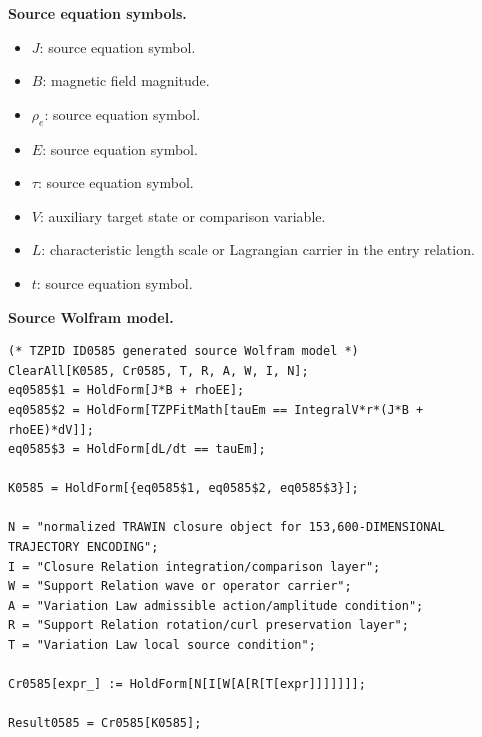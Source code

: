 \begin{minipage}[t]{0.49\linewidth}
\begingroup
\small
\raggedright
\textbf{Source equation symbols.}\par
\begin{itemize}[leftmargin=1.35em,itemsep=1pt,topsep=1pt,parsep=0pt]
    \item $J$: source equation symbol.
    \item $B$: magnetic field magnitude.
    \item $\rho_e$: source equation symbol.
    \item $E$: source equation symbol.
    \item $\tau$: source equation symbol.
    \item $V$: auxiliary target state or comparison variable.
    \item $L$: characteristic length scale or Lagrangian carrier in the entry relation.
    \item $t$: source equation symbol.
\end{itemize}
\endgroup
\end{minipage}\hfill
\begin{minipage}[t]{0.47\linewidth}
\begingroup
\scriptsize
\raggedright
\textbf{Source Wolfram model.}\par
\begin{Verbatim}[fontsize=\tiny,breaklines=true,breakanywhere=true]
(* TZPID ID0585 generated source Wolfram model *)
ClearAll[K0585, Cr0585, T, R, A, W, I, N];
eq0585$1 = HoldForm[J*B + rhoEE];
eq0585$2 = HoldForm[TZPFitMath[tauEm == IntegralV*r*(J*B + rhoEE)*dV]];
eq0585$3 = HoldForm[dL/dt == tauEm];

K0585 = HoldForm[{eq0585$1, eq0585$2, eq0585$3}];

N = "normalized TRAWIN closure object for 153,600-DIMENSIONAL TRAJECTORY ENCODING";
I = "Closure Relation integration/comparison layer";
W = "Support Relation wave or operator carrier";
A = "Variation Law admissible action/amplitude condition";
R = "Support Relation rotation/curl preservation layer";
T = "Variation Law local source condition";

Cr0585[expr_] := HoldForm[N[I[W[A[R[T[expr]]]]]]];

Result0585 = Cr0585[K0585];
\end{Verbatim}
\endgroup
\end{minipage}

